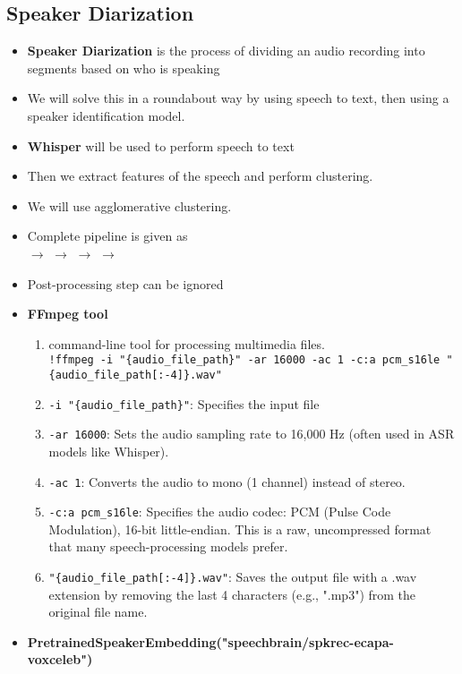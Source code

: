 \documentclass[a4paper]{article}
\begin{document}
\subsection{Speaker Diarization}
\begin{itemize}
    \item \textbf{Speaker Diarization} is the process of dividing an audio recording into segments based on who is speaking
    \item We will solve this in a roundabout way by using speech to text, then using a speaker identification model.
    \item \textbf{Whisper} will be used to perform speech to text
    \item Then we extract features of the speech and perform clustering.
    \item We will use agglomerative clustering.
    \item Complete pipeline is given as\\
     $\to$  $\to$  $\to$  $\to$ 
    \item Post-processing step can be ignored
    \item \textbf{FFmpeg tool}
    \begin{enumerate}
        \item command-line tool for processing multimedia files.\\
        \verb|!ffmpeg -i "{audio_file_path}" -ar 16000 -ac 1 -c:a pcm_s16le "{audio_file_path[:-4]}.wav"|
        \item \verb|-i "{audio_file_path}"|: Specifies the input file 
        \item \verb|-ar 16000|: Sets the audio sampling rate to 16,000 Hz (often used in ASR models like Whisper).
        \item \verb|-ac 1|: Converts the audio to mono (1 channel) instead of stereo.
        \item \verb|-c:a pcm_s16le|: Specifies the audio codec: PCM (Pulse Code Modulation), 16-bit little-endian. This is a raw, uncompressed format that many speech-processing models prefer.
        \item \verb|"{audio_file_path[:-4]}.wav"|: Saves the output file with a .wav extension by removing the last 4 characters (e.g., ".mp3") from the original file name.
    \end{enumerate}
    \item \textbf{PretrainedSpeakerEmbedding("speechbrain/spkrec-ecapa-voxceleb")}

\end{itemize}
\end{document}
